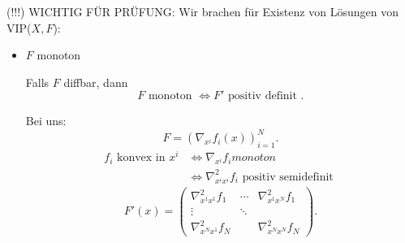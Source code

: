 (!!!) WICHTIG FÜR PRÜFUNG:
Wir brachen für Existenz von Lösungen von VIP($X,F$):
\begin{itemize}
	\item $F$ monoton

	 Falls $F$ diffbar, dann
		\[
			F \text{ monoton } \iff F' \text{ positiv definit }
		.\] 

		Bei uns:
		\[
			F=(\nabla _{x^{i}}f_{i}(x))_{i=1}^{N}
		.\] 
		\begin{align*}
			f_{i}\text{ konvex in } x^{i} &\iff \nabla _{x^{i}}f_{i} monoton \\
										  &\iff \nabla _{x^{i}x^{i}}^2 f_{i} \text{ positiv semidefinit }
		\end{align*}
		\[
			F'(x) = \begin{pmatrix}
			\nabla _{x^{1}x^{1}}^2 f_{1}
			&\cdots
			&\nabla _{x^{1}x^{N}}^2 f_{1} \\
			\vdots& \ddots \\
			\nabla _{x^{N}x^{1}}^2 f_{N}&& \nabla _{x^{N}x^{N}}^2 f_{N}
			\end{pmatrix}
		.\] 
\end{itemize}

